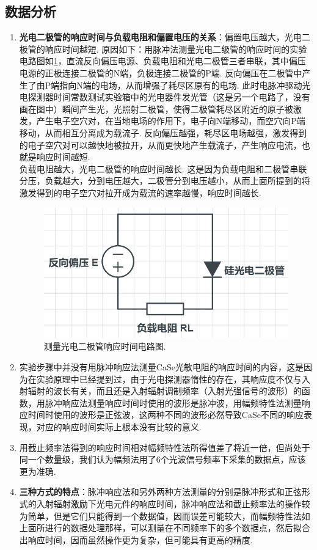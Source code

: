 \documentclass[UTF8,10pt,a4paper]{article}
\begin{document}
\subsection{数据分析}
\begin{enumerate}
    \item \textbf{光电二极管的响应时间与负载电阻和偏置电压的关系}：偏置电压越大，光电二极管的响应时间越短. 原因如下：用脉冲法测量光电二级管的响应时间的实验电路图如\ref{2-F-4}，直流反向偏压电源、负载电阻和光电二极管三者串联，其中偏压电源的正极连接二极管的N端，负极连接二极管的P端. 反向偏压在二极管中产生了由P端指向N端的电场，从而增强了耗尽区原有的电场. 此时电脉冲驱动光电探测器时间常数测试实验箱中的光电器件发光管（这是另一个电路了，没有画在图中）瞬间产生光，光照射二极管，使得二极管耗尽区附近的原子被激发，产生电子空穴对，在当地电场的作用下，电子向N端移动，而空穴向P端移动，从而相互分离成为载流子. 反向偏压越强，耗尽区电场越强，激发得到的电子空穴对可以越快地被拉开，从而更快地产生载流子，产生响应电流，也就是响应时间越短.\\
    负载电阻越大，光电二极管的响应时间越长. 这是因为负载电阻和二极管串联分压，负载越大，分到电压越大，二极管分到电压越小，从而上面所提到的将激发得到的电子空穴对拉开成为载流的速率越慢，响应时间越长.
    \begin{figure}[h]
        \centering
        \includegraphics[width=.45\textwidth]{2-F-4.png}
        \caption{测量光电二极管响应时间电路图.}
        \label{2-F-4}
    \end{figure}
    \item 实验步骤中并没有用脉冲响应法测量CaSe光敏电阻的响应时间的内容，这是因为在实验原理中已经提到过，由于光电探测器惰性的存在，其响应度不仅与入射辐射的波长有关，而且还是入射辐射调制频率（入射光强信号的波形）的函数，用脉冲响应法测量响应时间时使用的波形是脉冲波，用幅频特性法测量响应时间时使用的波形是正弦波，这两种不同的波形必然导致CaSe不同的响应表现，对应的响应时间实际上根本没有比较的意义.
    \item 用截止频率法得到的响应时间相对幅频特性法所得值差了将近一倍，但尚处于同一个数量级，我们认为幅频法用了6个光波信号频率下采集的数据点，应该更为准确.
    \item \textbf{三种方式的特点}：脉冲响应法和另外两种方法测量的分别是脉冲形式和正弦形式的入射辐射激励下光电元件的响应时间，脉冲响应法和截止频率法的操作较为简单，但是它们只能得到一个数据值，因而误差可能较大，而幅频特性法如上面所进行的数据处理那样，可以测量在不同频率下的多个数据点，然后拟合出响应时间，因而虽然操作更为复杂，但可能具有更高的精度.
\end{enumerate}
\end{document}
